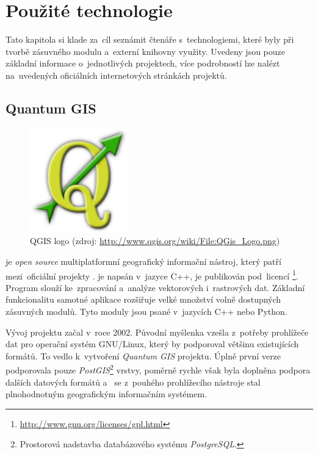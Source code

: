 \chapter{Použité technologie}
\label{4-technologie}

Tato kapitola si klade za~cíl seznámit čtenáře s~technologiemi, které byly 
při tvorbě zásuvného modulu a~externí knihovny využity. Uvedeny jsou pouze
základní informace o~jednotlivých projektech, více podrobností lze
nalézt na~uvedených oficiálních internetových stránkách projektů.


\section{Quantum GIS}
\label{qgis}

  \begin{figure}[H]
    \centering
      \includegraphics[width=120pt]{./pictures/qgis.png}
      \caption[QGIS logo]{QGIS logo 
      (zdroj: \url{http://www.qgis.org/wiki/File:QGis_Logo.png})}
      \label{fig:qgis}
  \end{figure}

 je \textit{open source} multiplatformní geografický 
informační ná\-stroj, který patří mezi~oficiální projekty .
 je napsán v~jazyce C++, je pu\-blikován pod~licencí 
\footnote{\url{http://www.gnu.org/licenses/gpl.html}}. 
Program slouží ke~zpracování a~analýze vektorových i~rastrových dat. 
Základní funkcionalitu sa\-motné aplikace rozšiřuje velké množství 
volně dostupných zásuvných modulů. Tyto moduly jsou psané v~jazycích 
C++ nebo Python.

Vývoj projektu  začal v~roce 2002. Původní myšlenka vzešla 
z~potřeby prohlížeče  dat pro operační systém GNU/Linux, který 
by podporoval většinu existujících formátů. To vedlo k~vytvoření 
\textit{Quantum GIS} projektu. Úplně první verze podporovala pouze 
\textit{PostGIS}\footnote{Prostorová nadstavba databázového systému 
\textit{PostgreSQL}.} vrstvy, poměrně rychle však byla doplněna podpora 
dalších datových formátů a~ se z~pouhého prohlížecího nástroje 
stal plnohodnotným geografickým informačním systémem.


